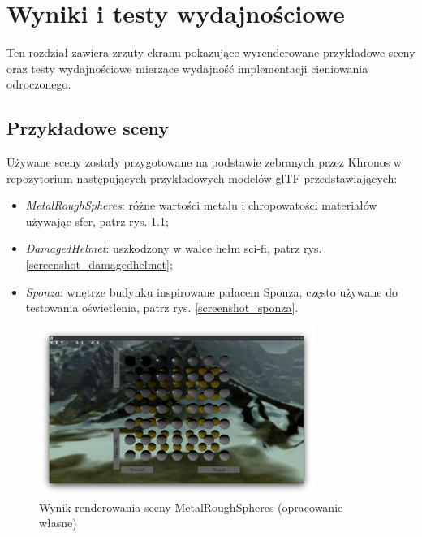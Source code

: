 \chapter{Wyniki i testy wydajnościowe}
\label{chap:research}

Ten rozdział zawiera zrzuty ekranu pokazujące wyrenderowane przykładowe sceny oraz testy wydajnościowe mierzące wydajność implementacji cieniowania odroczonego.


\section{Przykładowe sceny}

Używane sceny zostały przygotowane na podstawie zebranych przez Khronos w repozytorium \cite{GLTFSAMPLEMODELS} następujących przykładowych modelów glTF przedstawiających:
\begin{itemize}
	\item \textit{MetalRoughSpheres}: różne wartości metalu i chropowatości materiałów używając sfer, patrz rys. \ref{screenshot_metalroughspheres};
	\item \textit{DamagedHelmet}: uszkodzony w walce hełm sci-fi, patrz rys. \ref{screenshot_damagedhelmet};
	\item \textit{Sponza}: wnętrze budynku inspirowane pałacem Sponza, często używane do testowania oświetlenia, patrz rys. \ref{screenshot_sponza}.
\end{itemize}

\begin{figure}[!htb]
	\centering
	\includegraphics[width=0.8\textwidth]{images/render_metalroughspheres.png}
	\caption{Wynik renderowania sceny MetalRoughSpheres (opracowanie własne)}
	\label{screenshot_metalroughspheres}
\end{figure}

